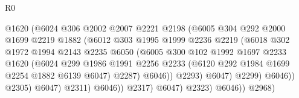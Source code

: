 \begin{lexlean}{R0}
\begin{coremodule}
                                    @1620
                                    (@6024
                                      @306
                                      @2002
                                      @2007
                                      @2221
                                      @2198
                                      (@6005
                                        @304
                                        @292
                                        @2000
                                        @1699
                                        @2219
                                        @1882
                                        (@6012
                                          @303
                                          @1995
                                          @1999
                                          @2236
                                          @2219
                                          (@6018
                                            @302
                                            @1972
                                            @1994
                                            @2143
                                            @2235
                                            @6050
                                            (@6005
                                              @300
                                              @102
                                              @1992
                                              @1697
                                              @2233
                                              @1620
                                              (@6024
                                                @299
                                                @1986
                                                @1991
                                                @2256
                                                @2233
                                                (@6120 @292 @1984 @1699 @2254 @1882 @6139 @6047)
                                                @2287)
                                              @6046))
                                          @2293)
                                        @6047)
                                      @2299)
                                    @6046))
                                @2305)
                              @6047)
                            @2311)
                          @6046))
                      @2317)
                    @6047)
                  @2323)
                @6046))
            @2968)

\end{coremodule}
\end{lexlean}
